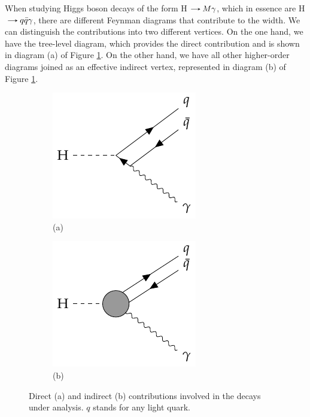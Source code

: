 When studying Higgs boson decays of the form H$\decaysto M\gamma$, which in essence are H$\decaysto q\bar{q}\gamma$, there are different Feynman diagrams that contribute to the width. We can distinguish the contributions into two different vertices. On the one hand, we have the tree-level diagram, which provides the direct contribution and is shown in diagram (a) of Figure \ref{fig:Higgs_rare_decay_veritces}. On the other hand, we have all other higher-order diagrams joined as an effective indirect vertex, represented in diagram (b) of Figure \ref{fig:Higgs_rare_decay_veritces}.

\begin{figure}[!ht]
    \captionsetup[subfigure]{labelformat=empty}
    \vspace*{-0.2cm}
    \centering
    \setlength{\mylength}{\textwidth}
    \begin{subfigure}[t]{0.5\mylength}
            \centering
            \includegraphics[height=0.26\mylength]{resources/H_rare_decays_vertices/v1.pdf}
            \setlength{\unitlength}{0.26\mylength}
            \caption{\footnotesize (a)}
    \end{subfigure}%
    \begin{subfigure}[t]{0.5\mylength}
            \centering
            \includegraphics[height=0.26\mylength]{resources/H_rare_decays_vertices/v2_2.pdf}
            \setlength{\unitlength}{0.26\mylength}
            \caption{\footnotesize (b)}
    \end{subfigure}%
    \vspace*{-0.0cm}
    \caption{Direct (a) and indirect (b) contributions involved in the decays under analysis. $q$ stands for any light quark.}
    \label{fig:Higgs_rare_decay_veritces}
    \vspace*{-0.0cm}
\end{figure}

